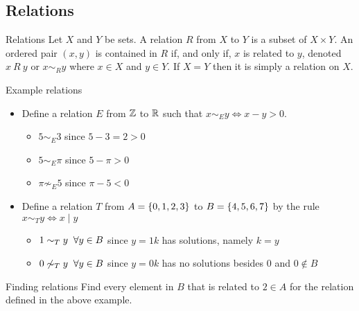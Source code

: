\subsection{Relations}
\begin{definition}{Relations}{}
    Let $X$ and $Y$ be sets. A relation $R$ from $X$ to $Y$ is a subset of $X \times Y$. An ordered pair $(x, y)$ is contained in $R$ if, and only if, $x$ is related to $y$, denoted $x~R~ y$ or $x \sim_R y$ where $x \in X$ and $y \in Y$. If $X = Y$ then it is simply a relation on $X$.
\end{definition}

\begin{example}{Example relations}{}
    \begin{itemize}
        \item Define a relation $E$ from $\mathbb Z$ to $\mathbb R$ such that $x \sim_E y \Leftrightarrow x - y > 0$. 
        \begin{itemize}
            \item $5 \sim_E 3$ since $5-3 = 2 > 0$
            \item $5 \sim_E \pi$ since $5 - \pi > 0$
            \item $\pi \not\sim_E 5$ since $\pi - 5 < 0$
        \end{itemize}

        \item Define a relation $T$ from $A = \{0, 1, 2, 3\}$ to $B = \{4, 5, 6, 7\}$ by the rule $x \sim_T y \Leftrightarrow x \mid y$ 
        \begin{itemize}
            \item $1 \sim_T y \hspace{0.2cm} \forall y \in B$ since $y = 1k$ has solutions, namely $k=y$
            \item $0 \not\sim_T y \hspace{0.2cm} \forall y \in B$ since $y = 0k$ has no solutions besides $0$ and $0 \notin B$
        \end{itemize}
    \end{itemize}
\end{example}

\begin{question}{Finding relations}{}
    Find every element in $B$ that is related to $2 \in A$ for the relation defined in the above example.
\end{question}

